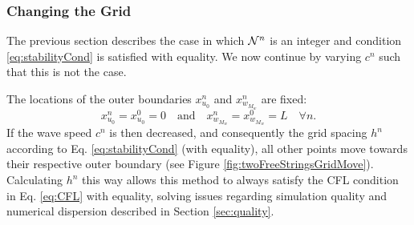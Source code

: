 \subsubsection{Changing the Grid}\label{sec:changingGrid}
The previous section describes the case in which $\mathcal{N}^n$ is an integer and condition \eqref{eq:stabilityCond} is satisfied with equality. %
We now continue by varying $c^n$ such that this is not the case.

The locations of the outer boundaries $x_{u_0}^n$ and $x_{w_{M_w}}^n$ are fixed:
\begin{equation*}
    x_{u_0}^n = x_{u_0}^0 = 0 \quad \text{and}\quad x_{w_{M_w}}^n = x_{w_{M_w}}^0 = L \quad \forall n.
\end{equation*}
If the wave speed $c^n$ is then decreased, and consequently the grid spacing $h^n$ according to Eq. \eqref{eq:stabilityCond} (with equality), all other points move towards their respective outer boundary (see Figure \ref{fig:twoFreeStringsGridMove}). Calculating $h^n$ this way allows this method to always satisfy the CFL condition in Eq. \eqref{eq:CFL} with equality, solving issues regarding simulation quality and numerical dispersion described in Section \ref{sec:quality}. %


